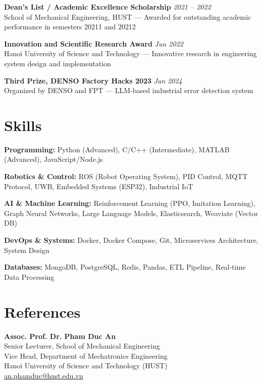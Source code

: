 \documentclass[11pt,a4paper]{article}
\begin{document}
\noindent\textbf{Dean's List / Academic Excellence Scholarship} \hfill \textit{2021 -- 2022} \\
School of Mechanical Engineering, HUST --- Awarded for outstanding academic performance in semesters 20211 and 20212

\vspace{0.3em}

\noindent\textbf{Innovation and Scientific Research Award} \hfill \textit{Jun 2022} \\
Hanoi University of Science and Technology --- Innovative research in engineering system design and implementation

\vspace{0.3em}

\noindent\textbf{Third Prize, DENSO Factory Hacks 2023} \hfill \textit{Jan 2024} \\
Organized by DENSO and FPT --- LLM-based industrial error detection system

\section{Skills}

\noindent\textbf{Programming:} Python (Advanced), C/C++ (Intermediate), MATLAB (Advanced), JavaScript/Node.js

\vspace{0.15em}
\noindent\textbf{Robotics \& Control:} ROS (Robot Operating System), PID Control, MQTT Protocol, UWB, Embedded Systems (ESP32), Industrial IoT

\vspace{0.15em}
\noindent\textbf{AI \& Machine Learning:} Reinforcement Learning (PPO, Imitation Learning), Graph Neural Networks, Large Language Models, Elasticsearch, Weaviate (Vector DB)

\vspace{0.15em}
\noindent\textbf{DevOps \& Systems:} Docker, Docker Compose, Git, Microservices Architecture, System Design

\vspace{0.15em}
\noindent\textbf{Databases:} MongoDB, PostgreSQL, Redis, Pandas, ETL Pipeline, Real-time Data Processing

\section{References}

\noindent\textbf{Assoc. Prof. Dr. Pham Duc An} \\
Senior Lecturer, School of Mechanical Engineering \\
Vice Head, Department of Mechatronics Engineering \\
Hanoi University of Science and Technology (HUST) \\
\href{mailto:an.phamduc@hust.edu.vn}{an.phamduc@hust.edu.vn}
\end{document}

